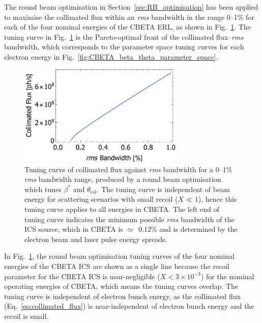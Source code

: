 \documentclass[../main.tex]{subfiles}
\begin{document}
The round beam optimisation in Section~\ref{sec:RB_optimisation} has been applied to maximise the collimated flux within an \textit{rms} bandwidth in the range 0--1\% for each of the four nominal energies of the CBETA ERL, as shown in Fig.~\ref{fig:CBETA_Tuning_Curve}. The tuning curve in Fig.~\ref{fig:CBETA_Tuning_Curve} is the Pareto-optimal front of the collimated flux--\textit{rms} bandwidth, which corresponds to the parameter space tuning curves for each electron energy in Fig.~\ref{fig:CBETA_beta_theta_parameter_space}. 
\begin{figure}[!h]
\centering
\includegraphics[width=0.7\textwidth]{Figures/CBETA_Inverse_Compton_Source_Design/CBETA150_RB_Fcol_BW.pdf}
\caption{Tuning curve of collimated flux against \textit{rms} bandwidth for a 0--1\% \textit{rms} bandwidth range, produced by a round beam optimisation which tunes $\beta^{*}$ and $\theta_{\mathrm{col}}$. The tuning curve is independent of beam energy for scattering scenarios with small recoil ($X \ll 1$), hence this tuning curve applies to all energies in CBETA. The left end of tuning curve indicates the minimum possible \textit{rms} bandwidth of the ICS source, which in CBETA is $\simeq$~0.12\% and is determined by the electron beam and laser pulse energy spreads.}
\label{fig:CBETA_Tuning_Curve}
\end{figure}
In Fig.~\ref{fig:CBETA_Tuning_Curve}, the round beam optimisation tuning curves of the four nominal energies of the CBETA ICS are shown as a single line because the recoil parameter for the CBETA ICS is near-negligible ($X<3\times 10^{-3}$) for the nominal operating energies of CBETA, which means the tuning curves overlap. The tuning curve is independent of electron bunch energy, as the collimated flux (Eq.~\ref{eq:collimated_flux}) is near-independent of electron bunch energy and the recoil is small. 
\end{document}
